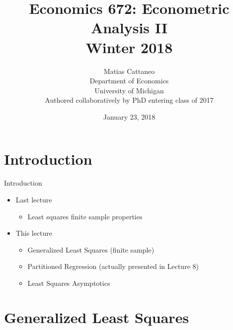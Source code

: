 \documentclass[fleqn, 10pt]{beamer}
\title[Econ-672]{Economics 672: Econometric Analysis II \\ Winter 2018}
\author[M. Cattaneo]{Matias Cattaneo \\
        Department of Economics \\
        University of Michigan \\
        Authored collaboratively by PhD entering class of 2017
        }
\date{January 23, 2018}
\begin{document}


\begin{frame}[plain]
    \titlepage
\end{frame}


\section{Introduction}

\begin{frame}{Introduction}
    \begin{itemize}
	\item Last lecture
	    \begin{itemize}
			\item Least squares finite sample properties
		\end{itemize}
	\item This lecture
	    \begin{itemize}
			\item Generalized Least Squares (finite sample)
			\item Partitioned Regression (actually presented in Lecture 8)
			\item Least Squares Asymptotics
		\end{itemize}
	\end{itemize}

\end{frame}


\section{Generalized Least Squares}
\end{document}
